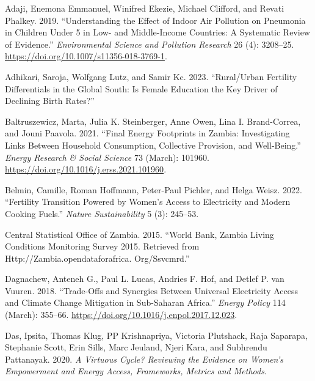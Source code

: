 \documentclass[
]{article}
\newlength{\cslhangindent}
\newlength{\cslentryspacingunit} %
\newenvironment{CSLReferences}[2] %
 {%
  \setlength{\parindent}{0pt}
  \ifodd #1
  \let\oldpar\par
  \def\par{\hangindent=\cslhangindent\oldpar}
  \fi
  \setlength{\parskip}{#2\cslentryspacingunit}
 }%
 {}
\begin{document}
\hypertarget{refs}{}
\begin{CSLReferences}{1}{0}
\leavevmode{}%
Adaji, Enemona Emmanuel, Winifred Ekezie, Michael Clifford, and Revati Phalkey. 2019. {``Understanding the Effect of Indoor Air Pollution on Pneumonia in Children Under 5 in Low- and Middle-Income Countries: A Systematic Review of Evidence.''} \emph{Environmental Science and Pollution Research} 26 (4): 3208--25. \url{https://doi.org/10.1007/s11356-018-3769-1}.

\leavevmode{}%
Adhikari, Saroja, Wolfgang Lutz, and Samir Kc. 2023. {``Rural/Urban Fertility Differentials in the {Global} {South}: {Is} Female Education the Key Driver of Declining Birth Rates?''}

\leavevmode{}%
Baltruszewicz, Marta, Julia K. Steinberger, Anne Owen, Lina I. Brand-Correa, and Jouni Paavola. 2021. {``Final Energy Footprints in {Zambia}: {Investigating} Links Between Household Consumption, Collective Provision, and Well-Being.''} \emph{Energy Research \& Social Science} 73 (March): 101960. \url{https://doi.org/10.1016/j.erss.2021.101960}.

\leavevmode{}%
Belmin, Camille, Roman Hoffmann, Peter-Paul Pichler, and Helga Weisz. 2022. {``Fertility Transition Powered by Women's Access to Electricity and Modern Cooking Fuels.''} \emph{Nature Sustainability} 5 (3): 245--53.

\leavevmode{}%
Central Statistical Office of Zambia. 2015. {``World {Bank}, {Zambia} {Living} {Conditions} {Monitoring} {Survey} 2015. {Retrieved} from Http://Zambia.opendataforafrica. Org/Ssvcmrd.''}

\leavevmode{}%
Dagnachew, Anteneh G., Paul L. Lucas, Andries F. Hof, and Detlef P. van Vuuren. 2018. {``Trade-Offs and Synergies Between Universal Electricity Access and Climate Change Mitigation in {Sub}-{Saharan} {Africa}.''} \emph{Energy Policy} 114 (March): 355--66. \url{https://doi.org/10.1016/j.enpol.2017.12.023}.

\leavevmode{}%
Das, Ipsita, Thomas Klug, PP Krishnapriya, Victoria Plutshack, Raja Saparapa, Stephanie Scott, Erin Sills, Marc Jeuland, Njeri Kara, and Subhrendu Pattanayak. 2020. \emph{A {Virtuous} {Cycle}? {Reviewing} the Evidence on Women's Empowerment and Energy Access, Frameworks, Metrics and Methods}.


\end{CSLReferences}
\end{document}
